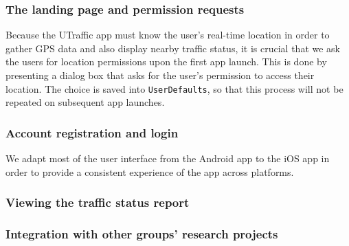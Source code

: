 \subsubsection{The landing page and permission requests}
Because the UTraffic app must know the user's real-time location in order to gather GPS data and also display nearby traffic status, it is crucial that we ask the users for location permissions upon the first app launch. This is done by presenting a dialog box that asks for the user's permission to access their location. The choice is saved into \lstinline{UserDefaults}, so that this process will not be repeated on subsequent app launches.

\subsubsection{Account registration and login}
We adapt most of the user interface from the Android app to the iOS app in order to provide a consistent experience of the app across platforms. 

\subsubsection{Viewing the traffic status report}

\subsubsection{Integration with other groups' research projects}




